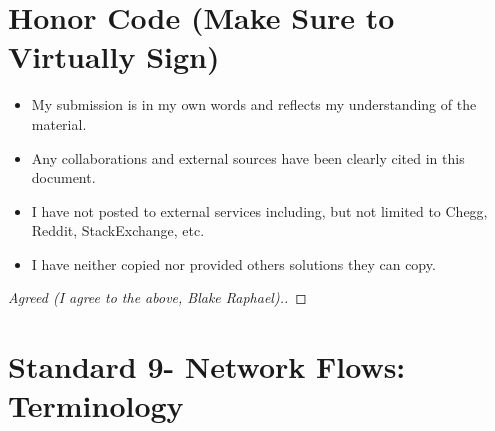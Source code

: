 \documentclass[11pt]{article}
\theoremstyle{definition}
\theoremstyle{definition}
\theoremstyle{definition}
\begin{document}
\section{Honor Code (Make Sure to Virtually Sign)} \label{HonorCode}

\begin{itemize}
\item My submission is in my own words and reflects my understanding of the material.
\item Any collaborations and external sources have been clearly cited in this document.
\item I have not posted to external services including, but not limited to Chegg, Reddit, StackExchange, etc.
\item I have neither copied nor provided others solutions they can copy.
\end{itemize}


\begin{proof}[Agreed (I agree to the above, Blake Raphael).]
\end{proof}

\newpage
\section{Standard 9- Network Flows: Terminology}
\end{document}

